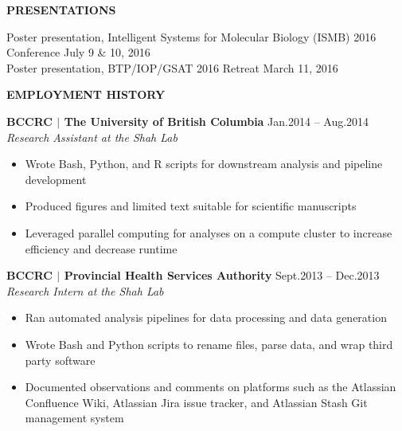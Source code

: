 \documentclass{res}
\renewcommand{\section}[1]{%
  \vspace{0.3in}%
  \centerline{\uppercase{\bf{#1}}}%
  \vspace{-6pt}}
\newcommand{\linepresentation}[3]{%
  #3 \hfill #1\\[.75ex]}
\newcommand{\linehead}[2]{%
  {\bf #1} \hfill #2\\}
\newcommand{\linetitle}[1]{%
  {\sl #1}}
\begin{document}
\begin{resume}
\section{Presentations}

\linepresentation{July 9 \& 10, 2016}{%
  Bioinformatic characterization of the normal thyroid reference epigenome}{%
  Poster presentation, Intelligent Systems for Molecular Biology (ISMB) 2016 Conference}
\linepresentation{March 11, 2016}{%
  Characterization of the normal reference thyroid epigenome}{%
  Poster presentation, BTP/IOP/GSAT 2016 Retreat}
\vspace{-1.5em}

\section{Employment history}

\linehead{BCCRC $|$ The University of British Columbia}{Jan.2014 -- Aug.2014}
\linetitle{Research Assistant at the Shah Lab}
\begin{itemize}
  \item Wrote Bash, Python, and R scripts for downstream analysis and pipeline development
  \item Produced figures and limited text suitable for scientific manuscripts
  \item Leveraged parallel computing for analyses on a compute cluster to increase efficiency and decrease runtime
\end{itemize}

\linehead{BCCRC $|$ Provincial Health Services Authority}{Sept.2013 -- Dec.2013}
\linetitle{Research Intern at the Shah Lab}
\begin{itemize}
  \item Ran automated analysis pipelines for data processing and data generation
  \item Wrote Bash and Python scripts to rename files, parse data, and wrap third party software
  \item Documented observations and comments on platforms such as the Atlassian Confluence Wiki, Atlassian Jira issue tracker, and Atlassian Stash Git management system
\end{itemize}


\end{resume}
\end{document}
